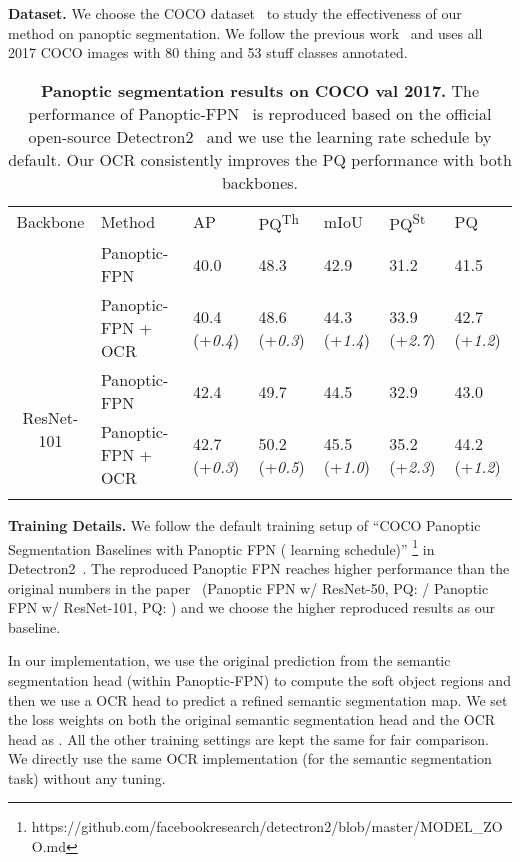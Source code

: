 \documentclass[runningheads]{llncs}
\begin{document}
\noindent\textbf{Dataset.}
We choose the COCO dataset~\cite{lin2014microsoft} to study the effectiveness of our method on panoptic segmentation.
We follow the previous work~\cite{kirillov2019panoptic} and uses all 2017
COCO images with 80 thing and 53 stuff classes annotated.

\begin{table*}[t!]
\centering
\caption{
\textbf{Panoptic segmentation results on COCO val 2017.} The performance of Panoptic-FPN~\cite{kirillov2019panoptic} is reproduced based on the official
open-source Detectron2~\cite{wu2019detectron2}
and we use the  learning rate schedule by default. Our OCR consistently improves the PQ performance with both backbones.}
\small
\resizebox{0.9\linewidth}{!}
{
\begin{tabular}{c|l|p{1.8cm}p{1.8cm}|p{1.8cm}p{1.8cm}|p{1.8cm}}
\shline
 Backbone & Method & AP & PQ\textsuperscript{Th} & mIoU & PQ\textsuperscript{St} & PQ \\
\shline
\multirow{2}{*}{ResNet-50} & Panoptic-FPN & 40.0 & 48.3 & 42.9 & 31.2 & 41.5 \\
& Panoptic-FPN + OCR  & {40.4} (+\emph{0.4}) & {48.6} (+\emph{0.3}) & {44.3} (+\emph{1.4}) & {33.9} (+\emph{2.7}) & {42.7} (+\emph{1.2}) \\
\hline
\multirow{2}{*}{ResNet-101} & Panoptic-FPN & 42.4 & 49.7 & 44.5 & 32.9 & 43.0 \\
& Panoptic-FPN + OCR  & {42.7} (+\emph{0.3}) & {50.2} (+\emph{0.5}) & {45.5} (+\emph{1.0}) & {35.2} (+\emph{2.3}) & {44.2} (+\emph{1.2}) \\
\shline
\end{tabular}
\label{table:panoptic}
}
\end{table*}

\noindent\textbf{Training Details.}
We follow the default training setup of ``COCO Panoptic Segmentation Baselines with Panoptic FPN ( learning schedule)''
\footnote{\rm{https://github.com/facebookresearch/detectron2/blob/master/MODEL\_ZOO.md}} in Detectron2~\cite{wu2019detectron2}.
The reproduced Panoptic FPN reaches higher performance than the original numbers in the paper~\cite{kirillov2019panoptic} (Panoptic FPN w/ ResNet-50, PQ:  / Panoptic FPN w/ ResNet-101, PQ: ) and we choose the higher reproduced results as our baseline.

In our implementation,
we use the original prediction from the semantic segmentation head (within Panoptic-FPN) to compute the soft object regions and then we use a OCR head to predict a refined
semantic segmentation map.
We set the loss weights on both the original semantic segmentation head and the OCR head as .
All the other training settings are kept the same for fair comparison.
We directly use the same OCR implementation (for the semantic segmentation task) without any tuning.
\end{document}
